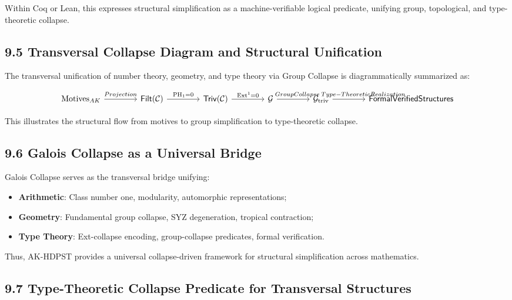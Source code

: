 \documentclass[11pt]{article}
\begin{document}
Within Coq or Lean, this expresses structural simplification as a machine-verifiable logical predicate, unifying group, topological, and type-theoretic collapse.

\subsection*{9.5 Transversal Collapse Diagram and Structural Unification}

The transversal unification of number theory, geometry, and type theory via Group Collapse is diagrammatically summarized as:

\[
\begin{tikzcd}[column sep=4em]
\mathrm{Motives}_{AK} \arrow[r, "Projection"]
& \mathsf{Filt}(\mathcal{C}) \arrow[r, "\mathrm{PH}_1 = 0"]
& \mathsf{Triv}(\mathcal{C}) \arrow[r, "\mathrm{Ext}^1 = 0"]
& \mathcal{G} \arrow[r, "\hspace{1em}Group Collapse"]
& \mathcal{G}_{\mathrm{triv}} \arrow[r, "\hspace{3.5em}Type-Theoretic Realization"]
& \mathsf{Formal Verified Structures}
\end{tikzcd}
\]


This illustrates the structural flow from motives to group simplification to type-theoretic collapse.

\subsection*{9.6 Galois Collapse as a Universal Bridge}

Galois Collapse serves as the transversal bridge unifying:

\begin{itemize}
    \item \textbf{Arithmetic}: Class number one, modularity, automorphic representations;
    \item \textbf{Geometry}: Fundamental group collapse, SYZ degeneration, tropical contraction;
    \item \textbf{Type Theory}: Ext-collapse encoding, group-collapse predicates, formal verification.
\end{itemize}

Thus, AK-HDPST provides a universal collapse-driven framework for structural simplification across mathematics.

\subsection*{9.7 Type-Theoretic Collapse Predicate for Transversal Structures}
\end{document}
